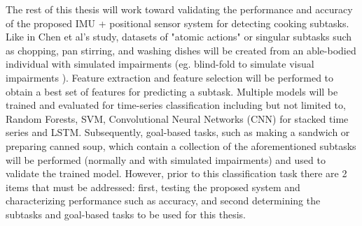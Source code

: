 The rest of this thesis will work toward validating the performance and accuracy of the proposed IMU + positional sensor system for detecting cooking subtasks. Like in Chen et al's study, datasets of "atomic actions" or singular subtasks such as chopping, pan stirring, and washing dishes \cite{chen_measuring_2021} will be created from an able-bodied individual with simulated impairments (eg. blind-fold to simulate visual impairments \cite{leo_negotiated_2014}). Feature extraction and feature selection will be performed to obtain a best set of features for predicting a subtask. Multiple models will be trained and evaluated for time-series classification including but not limited to, Random Forests, SVM, Convolutional Neural Networks (CNN) for stacked time series and LSTM. Subsequently, goal-based tasks, such as making a sandwich or preparing canned soup, which contain a collection of the aforementioned subtasks will be performed (normally and with simulated impairments) and used to validate the trained model. However, prior to this classification task there are 2 items that must be addressed: first, testing the proposed system and characterizing performance such as accuracy, and second determining the subtasks and goal-based tasks to be used for this thesis. 